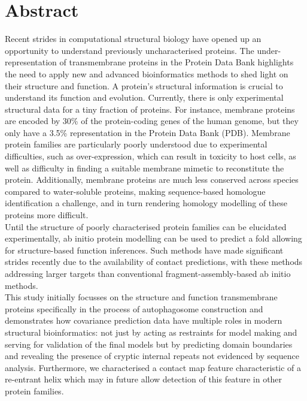 \documentclass[a4paper,oneside,12pt]{book}
\begin{document}
\newpage
\chapter{Abstract}
Recent strides in computational structural biology have opened up an opportunity to understand previously uncharacterised proteins.  The under-representation of transmembrane proteins in the Protein Data Bank highlights the need to apply new and advanced bioinformatics methods to shed light on their structure and function.  A protein’s structural information is crucial to understand its function and evolution. Currently, there is only experimental structural data for a tiny fraction of proteins. For instance, membrane proteins are encoded by 30\% of the protein-coding genes of the human genome, but they only have a 3.5\% representation in the Protein Data Bank (PDB). Membrane protein families are particularly poorly understood due to experimental difficulties, such as over-expression, which can result in toxicity to host cells, as well as difficulty in finding a suitable membrane mimetic to reconstitute the protein. Additionally, membrane proteins are much less conserved across species compared to water-soluble proteins, making sequence-based homologue identification a challenge, and in turn rendering homology modelling of these proteins more difficult. \\

Until the structure of poorly characterised protein families can be elucidated experimentally, ab initio protein modelling can be used to predict a fold allowing for structure-based function inferences. Such methods have made significant strides recently due to the availability of contact predictions, with these methods addressing larger targets than conventional fragment-assembly-based ab initio methods. \\

This study initially focusses on the structure and function transmembrane proteins specifically in the process of autophagosome construction and demonstrates how covariance prediction data have multiple roles in modern structural bioinformatics: not just by acting as restraints for model making and serving for validation of the final models but by predicting domain boundaries and revealing the presence of cryptic internal repeats not evidenced by sequence analysis. Furthermore, we characterised a contact map feature characteristic of a re-entrant helix which may in future allow detection of this feature in other protein families. \\
\end{document}
